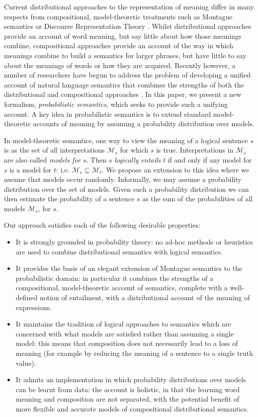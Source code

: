 \documentclass[letterpaper]{article}
\begin{document}
Current distributional approaches to the representation of meaning differ in many respects from compositional, model-theoretic treatments
such as Montague semantics or
Discourse Representation Theory \cite{Blackburn:05}. Whilst distributional approaches provide an account of word meaning, but say little about how those meanings combine, compositional approaches provide an account of the way in which meanings combine to build a semantics for larger phrases, but have little to say about the meanings of words or how they are acquired.  Recently however, a number of researchers have begun to address the problem of  developing a unified account of natural language semantics that combines the strengths of both the distributional and compositional approaches
\cite{Clarke:07,Coecke:10,Garrette:11,Lewis:13}.  In this paper, we present a new formalism, {\em probabilistic semantics\/}, which seeks to provide such a unifying
account. A key idea in probabilistic semantics is to extend standard model-theoretic
accounts of meaning by assuming a probability distribution over
models.  

In model-theoretic semantics, one way to view the meaning
of a logical sentence $s$ is as the set of all interpretations
$\mathcal{M}_s$ for which $s$ is true. Interpretations in $\mathcal{M}_s$ are also called {\em models for\/}
$s$. Then $s$ {\em logically entails\/} $t$ if and only if any model for $s$ is a model for $t$: i.e. $\mathcal{M}_s \subseteq
\mathcal{M}_t$. We propose an extension to this idea where we assume
that models occur randomly. Informally, we may assume a probability
distribution over the set of models. Given such a probability distribution we can then estimate the
probability of a sentence $s$ as the sum of the probabilities of all
models $\mathcal{M}_s$, for $s$. 


Our approach satisfies each of the following desirable properties:
\begin{itemize}
\item It is strongly grounded in probability theory: no ad-hoc methods
  or heuristics are used to combine distributional semantics with
  logical semantics.
\item It provides the basis of an elegant extension of Montague semantics to the
  probabilistic domain: in particular it combines the strengths of a compositional, model-theoretic account of semantics, complete with a well-defined notion of entailment, with a distributional account of the meaning of expressions.
\item It maintains the tradition of logical approaches to semantics
  which are concerned with what models are satisfied rather than
  assuming a single model: this means that composition does not
  necessarily lead to a loss of meaning (for example by reducing the meaning of a
  sentence to a single truth value).
 \item It admits an implementation in which probability
distributions over models can be learnt from data: the account is holistic, in that the learning word meaning and composition are not separated, with
  the potential benefit of more flexible and accurate models of
  compositional distributional semantics.
\end{itemize}
\end{document}
